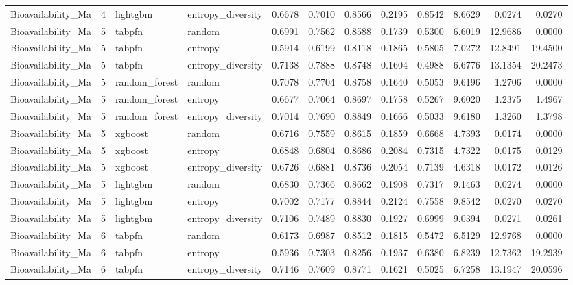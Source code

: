 \begin{tabular}{lrllrrrrrrrr}
Bioavailability_Ma & 4 & lightgbm & entropy_diversity & 0.6678 & 0.7010 & 0.8566 & 0.2195 & 0.8542 & 8.6629 & 0.0274 & 0.0270 \\
Bioavailability_Ma & 5 & tabpfn & random & 0.6991 & 0.7562 & 0.8588 & 0.1739 & 0.5300 & 6.6019 & 12.9686 & 0.0000 \\
Bioavailability_Ma & 5 & tabpfn & entropy & 0.5914 & 0.6199 & 0.8118 & 0.1865 & 0.5805 & 7.0272 & 12.8491 & 19.4500 \\
Bioavailability_Ma & 5 & tabpfn & entropy_diversity & 0.7138 & 0.7888 & 0.8748 & 0.1604 & 0.4988 & 6.6776 & 13.1354 & 20.2473 \\
Bioavailability_Ma & 5 & random_forest & random & 0.7078 & 0.7704 & 0.8758 & 0.1640 & 0.5053 & 9.6196 & 1.2706 & 0.0000 \\
Bioavailability_Ma & 5 & random_forest & entropy & 0.6677 & 0.7064 & 0.8697 & 0.1758 & 0.5267 & 9.6020 & 1.2375 & 1.4967 \\
Bioavailability_Ma & 5 & random_forest & entropy_diversity & 0.7014 & 0.7690 & 0.8849 & 0.1666 & 0.5033 & 9.6180 & 1.3260 & 1.3798 \\
Bioavailability_Ma & 5 & xgboost & random & 0.6716 & 0.7559 & 0.8615 & 0.1859 & 0.6668 & 4.7393 & 0.0174 & 0.0000 \\
Bioavailability_Ma & 5 & xgboost & entropy & 0.6848 & 0.6804 & 0.8686 & 0.2084 & 0.7315 & 4.7322 & 0.0175 & 0.0129 \\
Bioavailability_Ma & 5 & xgboost & entropy_diversity & 0.6726 & 0.6881 & 0.8736 & 0.2054 & 0.7139 & 4.6318 & 0.0172 & 0.0126 \\
Bioavailability_Ma & 5 & lightgbm & random & 0.6830 & 0.7366 & 0.8662 & 0.1908 & 0.7317 & 9.1463 & 0.0274 & 0.0000 \\
Bioavailability_Ma & 5 & lightgbm & entropy & 0.7002 & 0.7177 & 0.8844 & 0.2124 & 0.7558 & 9.8542 & 0.0270 & 0.0270 \\
Bioavailability_Ma & 5 & lightgbm & entropy_diversity & 0.7106 & 0.7489 & 0.8830 & 0.1927 & 0.6999 & 9.0394 & 0.0271 & 0.0261 \\
Bioavailability_Ma & 6 & tabpfn & random & 0.6173 & 0.6987 & 0.8512 & 0.1815 & 0.5472 & 6.5129 & 12.9768 & 0.0000 \\
Bioavailability_Ma & 6 & tabpfn & entropy & 0.5936 & 0.7303 & 0.8256 & 0.1937 & 0.6380 & 6.8239 & 12.7362 & 19.2939 \\
Bioavailability_Ma & 6 & tabpfn & entropy_diversity & 0.7146 & 0.7609 & 0.8771 & 0.1621 & 0.5025 & 6.7258 & 13.1947 & 20.0596 \\

\end{tabular}
